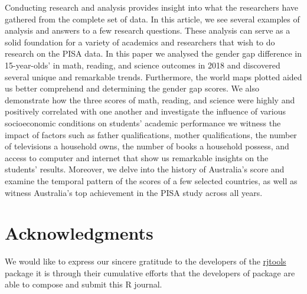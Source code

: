 Conducting research and analysis provides insight into what the
researchers have gathered from the complete set of data. In this
article, we see several examples of analysis and answers to a few
research questions. These analysis can serve as a solid foundation for a
variety of academics and researchers that wish to do research on the
PISA data. In this paper we analysed the gender gap difference in
15-year-olds' in math, reading, and science outcomes in 2018 and
discovered several unique and remarkable trends. Furthermore, the world
maps plotted aided us better comprehend and determining the gender gap
scores. We also demonstrate how the three scores of math, reading, and
science were highly and positively correlated with one another and
investigate the influence of various socioeconomic conditions on
students' academic performance we witness the impact of factors such as
father qualifications, mother qualifications, the number of televisions
a household owns, the number of books a household possess, and access to
computer and internet that show us remarkable insights on the students'
results. Moreover, we delve into the history of Australia's score and
examine the temporal pattern of the scores of a few selected countries,
as well as witness Australia's top achievement in the PISA study across
all years.

\hypertarget{acknowledgments}{%
\section{Acknowledgments}\label{acknowledgments}}

We would like to express our sincere gratitude to the developers of the
\href{https://github.com/rjournal/rjtools}{rjtools} \citep{rjtools}
package it is through their cumulative efforts that the developers of
 package are able to compose and submit this R
journal.



\address{%
Priya Ravindra Dingorkar\\
Monash University\\%
Department of Econometrics and Business Statistics\\ Clayton,
Australia\\
%
\url{https://www.linkedin.com/in/priya-dingorkar/}\\%
%
\href{mailto:priyadingorkar@gmail.com}{\nolinkurl{priyadingorkar@gmail.com}}%
}

\address{%
Kevin Y.X. Wang\\
University of Sydney\\%
School of Mathematics and Statistics\\ Sydney, Australia\\
%
\url{https://kevinwang09.github.io/}\\%
%
\href{mailto:kevinwangstats@gmail.com}{\nolinkurl{kevinwangstats@gmail.com}}%
}

\address{%
Dianne Cook\\
Monash University\\%
Department of Econometrics and Business Statistics\\ Clayton,
Australia\\
%
\url{http://dicook.org/}\\%
%
\href{mailto:dicook@monash.edu}{\nolinkurl{dicook@monash.edu}}%
}
